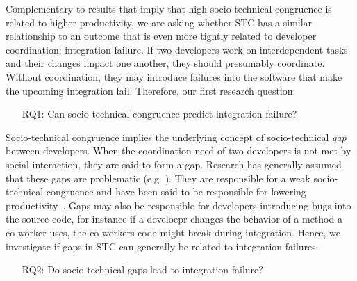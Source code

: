 \documentclass{sig-alternate}
\begin{document}
Complementary to results that imply that high socio-technical congruence is
related to higher productivity, we are asking whether STC has a similar
relationship to an outcome  that is even more tightly related
to developer coordination: integration failure.
If two developers work on interdependent tasks and their changes impact one
another, they should presumably coordinate. Without coordination, they may
introduce failures into the software that make the upcoming integration fail.
Therefore, our first research question:

\begin{enumerate}
\item[RQ1:] Can socio-technical congruence predict integration failure? 
\end{enumerate}

Socio-technical congruence implies the underlying
concept of socio-technical \emph{gap} between developers. 
When the coordination need of two developers is not met by social interaction, they are said to form a gap.
Research has generally assumed that these gaps are problematic (e.g. \cite{ehrlich:stc:2008}). 
They are responsible for a weak socio-technical congruence and have been said to be responsible for lowering productivity~\cite{cataldo:cscw:2006}. 
Gaps may also be responsible for
developers introducing bugs into the source code, for instance if a develoepr
changes the behavior of a method a co-worker uses, the co-workers code might
break during integration. 
Hence, we investigate if gaps in STC can generally be
related to integration failures.

\begin{enumerate}
\item[RQ2:] Do socio-technical gaps lead to integration failure?  
\end{enumerate}
\end{document}
